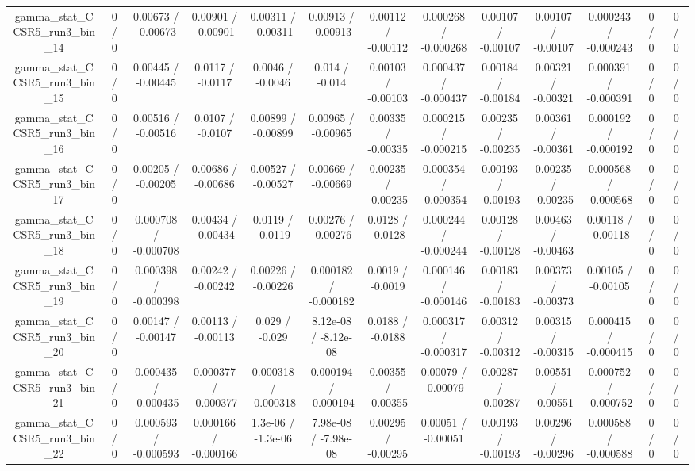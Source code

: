 \documentclass[10pt]{article}
\begin{document}
\begin{table}[htbp]
\begin{center}
\begin{tabular}{|c|c|c|c|c|c|c|c|c|c|c|c|c|}
  gamma_stat_CCSR5_run3_bin_14 & 0 / 0 & 0.00673 / -0.00673 & 0.00901 / -0.00901 & 0.00311 / -0.00311 & 0.00913 / -0.00913 & 0.00112 / -0.00112 & 0.000268 / -0.000268 & 0.00107 / -0.00107 & 0.00107 / -0.00107 & 0.000243 / -0.000243 & 0 / 0 & 0 / 0 \\ 
  gamma_stat_CCSR5_run3_bin_15 & 0 / 0 & 0.00445 / -0.00445 & 0.0117 / -0.0117 & 0.0046 / -0.0046 & 0.014 / -0.014 & 0.00103 / -0.00103 & 0.000437 / -0.000437 & 0.00184 / -0.00184 & 0.00321 / -0.00321 & 0.000391 / -0.000391 & 0 / 0 & 0 / 0 \\ 
  gamma_stat_CCSR5_run3_bin_16 & 0 / 0 & 0.00516 / -0.00516 & 0.0107 / -0.0107 & 0.00899 / -0.00899 & 0.00965 / -0.00965 & 0.00335 / -0.00335 & 0.000215 / -0.000215 & 0.00235 / -0.00235 & 0.00361 / -0.00361 & 0.000192 / -0.000192 & 0 / 0 & 0 / 0 \\ 
  gamma_stat_CCSR5_run3_bin_17 & 0 / 0 & 0.00205 / -0.00205 & 0.00686 / -0.00686 & 0.00527 / -0.00527 & 0.00669 / -0.00669 & 0.00235 / -0.00235 & 0.000354 / -0.000354 & 0.00193 / -0.00193 & 0.00235 / -0.00235 & 0.000568 / -0.000568 & 0 / 0 & 0 / 0 \\ 
  gamma_stat_CCSR5_run3_bin_18 & 0 / 0 & 0.000708 / -0.000708 & 0.00434 / -0.00434 & 0.0119 / -0.0119 & 0.00276 / -0.00276 & 0.0128 / -0.0128 & 0.000244 / -0.000244 & 0.00128 / -0.00128 & 0.00463 / -0.00463 & 0.00118 / -0.00118 & 0 / 0 & 0 / 0 \\ 
  gamma_stat_CCSR5_run3_bin_19 & 0 / 0 & 0.000398 / -0.000398 & 0.00242 / -0.00242 & 0.00226 / -0.00226 & 0.000182 / -0.000182 & 0.0019 / -0.0019 & 0.000146 / -0.000146 & 0.00183 / -0.00183 & 0.00373 / -0.00373 & 0.00105 / -0.00105 & 0 / 0 & 0 / 0 \\ 
  gamma_stat_CCSR5_run3_bin_20 & 0 / 0 & 0.00147 / -0.00147 & 0.00113 / -0.00113 & 0.029 / -0.029 & 8.12e-08 / -8.12e-08 & 0.0188 / -0.0188 & 0.000317 / -0.000317 & 0.00312 / -0.00312 & 0.00315 / -0.00315 & 0.000415 / -0.000415 & 0 / 0 & 0 / 0 \\ 
  gamma_stat_CCSR5_run3_bin_21 & 0 / 0 & 0.000435 / -0.000435 & 0.000377 / -0.000377 & 0.000318 / -0.000318 & 0.000194 / -0.000194 & 0.00355 / -0.00355 & 0.00079 / -0.00079 & 0.00287 / -0.00287 & 0.00551 / -0.00551 & 0.000752 / -0.000752 & 0 / 0 & 0 / 0 \\ 
  gamma_stat_CCSR5_run3_bin_22 & 0 / 0 & 0.000593 / -0.000593 & 0.000166 / -0.000166 & 1.3e-06 / -1.3e-06 & 7.98e-08 / -7.98e-08 & 0.00295 / -0.00295 & 0.00051 / -0.00051 & 0.00193 / -0.00193 & 0.00296 / -0.00296 & 0.000588 / -0.000588 & 0 / 0 & 0 / 0 \\ 

\end{tabular}
\end{center}
\end{table}
\end{document}
